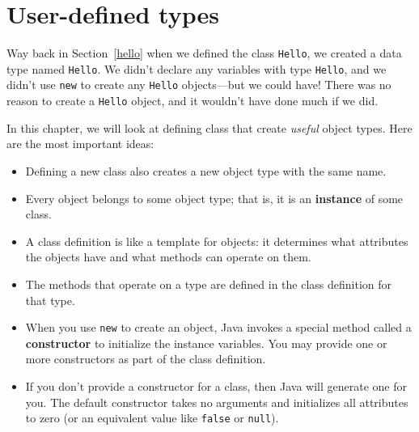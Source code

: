 \documentclass[12pt]{book}
\title{\thetitle}
\author{\theauthors}
\date{\theversion}
\theoremstyle{exercise}
\newcommand{\java}[1]{\lstinline{#1}} %
\begin{document}
\setcounter{chapter}{9}


\chapter{User-defined types}


Way back in Section~\ref{hello} when we defined the class \java{Hello}, we created a data type named \java{Hello}.
We didn't declare any variables with type \java{Hello}, and we didn't use \java{new} to create any \java{Hello} objects---but we could have!
There was no reason to create a \java{Hello} object, and it wouldn't have done much if we did.


In this chapter, we will look at defining class that create {\em useful} object types.
Here are the most important ideas:

\begin{itemize}

\item Defining a new class also creates a new object type with the same name.


\item Every object belongs to some object type; that is, it is an {\bf instance} of some class.

\item A class definition is like a template for objects: it determines what attributes the objects have and what methods can operate on them.

\item The methods that operate on a type are defined in the class definition for that type.


\item When you use \java{new} to create an object, Java invokes a special method called a {\bf constructor} to initialize the instance variables.
You may provide one or more constructors as part of the class definition.

\item If you don't provide a constructor for a class, then Java will generate one for you.
The default constructor takes no arguments and initializes all attributes to zero (or an equivalent value like \java{false} or \java{null}).

\end{itemize}
\end{document}
